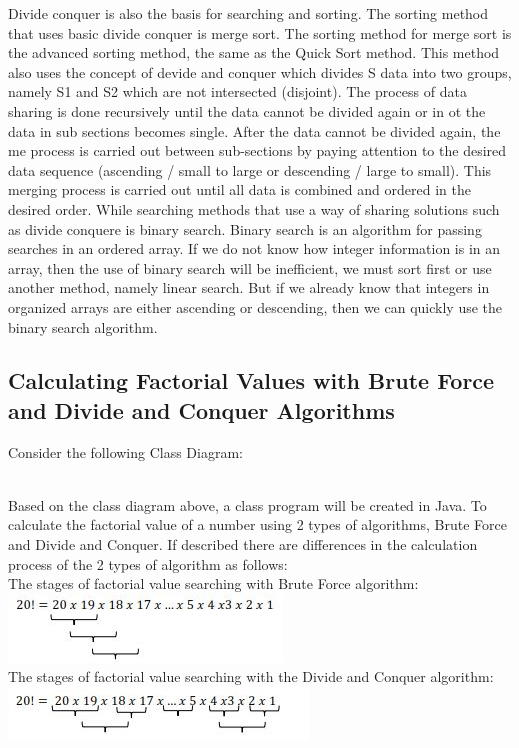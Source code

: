\documentclass[12pt,titlepage]{article}
\begin{document}
Divide conquer is also the basis for searching and sorting. The sorting method that uses basic divide conquer is merge sort. The sorting method for merge sort is the advanced sorting method, the same as the Quick Sort method. This method also uses the concept of devide and conquer which divides S data into two groups, namely S1 and S2 which are not intersected (disjoint). The process of data sharing is done recursively until the data cannot be divided again or in ot the data in sub sections becomes single. After the data cannot be divided again, the me process is carried out between sub-sections by paying attention to the desired data sequence (ascending / small to large or descending / large to small). This merging process is carried out until all data is combined and ordered in the desired order. While searching methods that use a way of sharing solutions such as divide conquere is binary search. Binary search is an algorithm for passing searches in an ordered array. If we do not know how integer information is in an array, then the use of binary search will be inefficient, we must sort first or use another method, namely linear search. But if we already know that integers in organized arrays are either ascending or descending, then we can quickly use the binary search algorithm.

\subsection{Calculating Factorial Values with Brute Force and Divide and Conquer Algorithms}
Consider the following Class Diagram:
\mbox{}\\
\mbox{}\\
Based on the class diagram above, a class program will be created in Java. To calculate the factorial value of a number using 2 types of algorithms, Brute Force and Divide and Conquer. If described there are differences in the calculation process of the 2 types of algorithm as follows:
\mbox{}\\
The stages of factorial value searching with Brute Force algorithm:
\mbox{}\\
\includegraphics[]{./images/figures/fig2.jpg}
\mbox{}\\
The stages of factorial value searching with the Divide and Conquer algorithm:
\mbox{}\\
\includegraphics[]{./images/figures/fig3.jpg}
\end{document}
